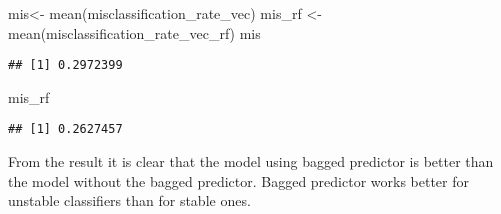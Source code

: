 \documentclass[
]{article}
\newenvironment{Shaded}{\begin{snugshade}}{\end{snugshade}}
\newcommand{\AttributeTok}[1]{\textcolor[rgb]{0.77,0.63,0.00}{#1}}
\newcommand{\CommentTok}[1]{\textcolor[rgb]{0.56,0.35,0.01}{\textit{#1}}}
\newcommand{\FunctionTok}[1]{\textcolor[rgb]{0.00,0.00,0.00}{#1}}
\newcommand{\NormalTok}[1]{#1}
\newcommand{\OtherTok}[1]{\textcolor[rgb]{0.56,0.35,0.01}{#1}}
\newcommand{\SpecialCharTok}[1]{\textcolor[rgb]{0.00,0.00,0.00}{#1}}
\begin{document}
\begin{Shaded}
\end{Shaded}

\begin{Shaded}
\begin{Highlighting}[]
\NormalTok{mis}\OtherTok{\textless{}{-}} \FunctionTok{mean}\NormalTok{(misclassification\_rate\_vec)}
\NormalTok{mis\_rf }\OtherTok{\textless{}{-}} \FunctionTok{mean}\NormalTok{(misclassification\_rate\_vec\_rf)}
\NormalTok{mis}
\end{Highlighting}
\end{Shaded}

\begin{verbatim}
## [1] 0.2972399
\end{verbatim}

\begin{Shaded}
\begin{Highlighting}[]
\NormalTok{mis\_rf}
\end{Highlighting}
\end{Shaded}

\begin{verbatim}
## [1] 0.2627457
\end{verbatim}

From the result it is clear that the model using bagged predictor is
better than the model without the bagged predictor. Bagged predictor
works better for unstable classifiers than for stable ones.
\end{document}
